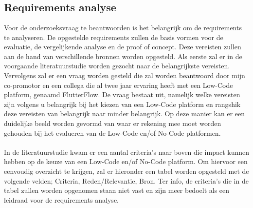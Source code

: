
\chapter{}%
\label{ch:methodologie}


\section*{Requirements analyse}
\label{sec:requirements-analyse}
Voor de onderzoeksvraag te beantwoorden is het belangrijk om de requirements te analyseren. De opgestelde requirements zullen de basis vormen voor 
de evaluatie, de vergelijkende analyse en de proof of concept. Deze vereisten zullen aan de hand van verschillende bronnen worden opgesteld. Als eerste zal 
er in de voorgaande literatuurstudie worden gezocht naar de belangrijkste vereisten. Vervolgens zal er een vraag worden gesteld die zal worden 
beantwoord door mijn co-promotor en een collega die al twee jaar ervaring heeft met een Low-Code platform, genaamd FlutterFlow. De vraag bestaat uit, namelijk welke vereisten zijn volgens u belangrijk bij het kiezen van een Low-Code platform en rangshik deze vereisten van belangrijk naar minder belangrijk. Op deze
manier kan er een duidelijke beeld worden gevormd van waar er rekening mee moet worden gehouden bij het evalueren van de Low-Code en/of No-Code platformen.
\\
\\
In de literatuurstudie kwam er een aantal criteria's naar boven die impact kunnen hebben op de keuze van een Low-Code en/of No-Code platform.
Om hiervoor een eenvoudig overzicht te krijgen, zal er hieronder een tabel worden opgesteld met de volgende velden; Criteria, Reden/Relevantie, Bron. 
Ter info, de criteria's die in de tabel zullen worden opgenomen staan niet vast en zijn meer bedoelt als een leidraad voor de requirements analyse.
\\
\\


